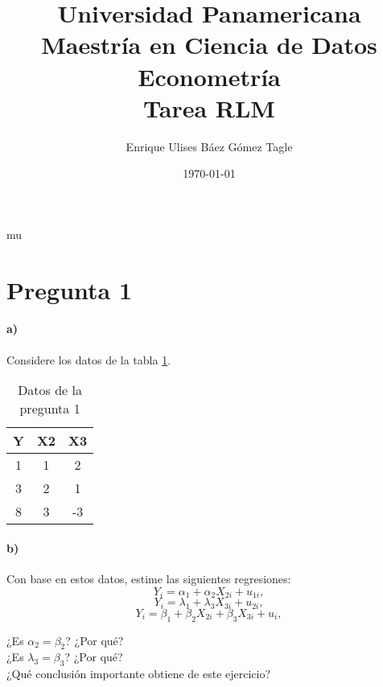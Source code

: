 mu\documentclass[10pt]{article}
\title{Universidad Panamericana \\ Maestría en Ciencia de Datos \\ Econometría \\ \vspace{0.5cm} Tarea RLM}
\author{Enrique Ulises Báez Gómez Tagle}
\date{\today}
\begin{document}
\maketitle

\tableofcontents

\newpage
\section{Pregunta 1}
\paragraph*{a)} Considere los datos de la tabla \ref{tab:datos_pregunta1}.
\begin{table}[H]
    \centering
    \begin{tabular}{ccc}
        Y & X2 & X3 \\
        \hline
        1 & 1 & 2 \\
        3 & 2 & 1 \\
        8 & 3 & -3 \\
        \hline
    \end{tabular}
    \caption{Datos de la pregunta 1}
    \label{tab:datos_pregunta1}
\end{table}

\paragraph*{b)} Con base en estos datos, estime las siguientes regresiones:
    \[
        Y_i=\alpha_1+\alpha_2X_{2i}+u_{1i},
    \]
    \[
        Y_i=\lambda_1+\lambda_3X_{3i}+u_{2i},
    \]
    \[
        Y_i=\beta_1+\beta_2X_{2i}+\beta_3X_{3i}+u_i,
    \]

     ¿Es $\alpha_2 = \beta_2$? ¿Por qué? \\

     ¿Es $\lambda_3 = \beta_3$? ¿Por qué? \\

     ¿Qué conclusión importante obtiene de este ejercicio? \\  
\end{document}
